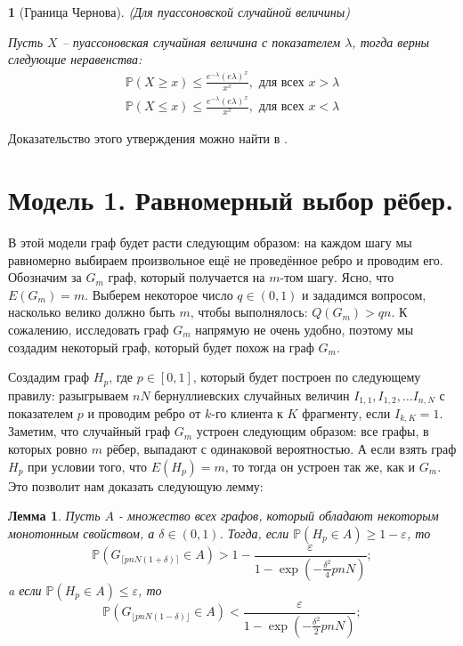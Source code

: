 \documentclass{matmex-diploma-custom}
\newcommand{\PRob}{\mathbb P}
\newcommand{\leqs}{\leqslant}
\newcommand{\geqs}{\geqslant}
\newcommand{\eps}{\varepsilon}
\newtheorem{lemma}{Лемма}
\theoremstyle{named}
\newtheorem*{namedpropo}{}
\begin{document}
\begin{namedpropo}[Граница Чернова] (Для пуассоновской случайной величины)

Пусть $X$ -- пуассоновская случайная величина с показателем $\lambda$, тогда верны следующие неравенства:
\begin{align} \label{gr_1}
\PRob(X \geqs x) \leqs \frac{e^{-\lambda}(e\lambda)^x}{x^x}, \text{ для всех } x > \lambda 
\\
\label{gr_2}
\PRob(X \leqs x) \leqs \frac{e^{-\lambda}(e\lambda)^x}{x^x}, \text{ для всех } x < \lambda 
\end{align}
\end{namedpropo}
Доказательство этого утверждения можно найти в \cite{chernov_gr}.

\section*{Модель 1. Равномерный выбор рёбер.}
В этой модели граф будет расти следующим образом: на каждом шагу мы равномерно выбираем произвольное ещё не проведённое ребро 
и проводим его. Обозначим за $G_m$ граф, который получается на $m$-том шагу. Ясно, что $E(G_m) = m$.
Выберем некоторое число $q \in (0, 1)$ и зададимся вопросом, насколько велико должно быть $m$, чтобы выполнялось: $Q(G_m) > qn$.
К сожалению, исследовать граф $G_m$ напрямую не очень удобно, поэтому мы создадим некоторый граф, который будет похож на граф $G_m$.

Создадим граф $H_p$, где $p \in [0, 1]$, который будет построен по следующему правилу: 
разыгрываем $nN$ бернуллиевских случайных величин $I_{1,1}, I_{1,2}, \dots I_{n,N}$ с показателем $p$ и проводим ребро от $k$-го клиента к $K$ фрагменту, 
если $I_{k, K} = 1$.
Заметим, что случайный граф $G_m$ устроен следующим образом: все графы, в которых ровно $m$ рёбер, выпадают с одинаковой вероятностью.
А если взять граф $H_p$ при условии того, что $E(H_p) = m$, то тогда он устроен так же, как и $G_m$.
Это позволит нам доказать следующую лемму:

\begin{lemma} \label{l1}
Пусть $A$ - множество всех графов, который обладают некоторым монотонным свойством, а $\delta \in (0,1)$.
Тогда, если $\PRob( H_p \in A) \geqs 1 - \eps$, то
\begin{equation} \label{l1_1}
\PRob(G_{\lceil pnN(1+\delta) \rceil} \in A) > 1 - \frac{\eps}{1 - \exp\left(-\frac{\delta^2}{4}pnN\right)};
\end{equation}
a если $\PRob( H_p \in A) \leqs \eps$, то
\begin{equation}\label{l1_2}
\PRob(G_{\lfloor pnN(1-\delta) \rfloor} \in A) < \frac{\eps}{1 - \exp\left(-\frac{\delta^2}{2}pnN\right)};
\end{equation}
\end{lemma}
\end{document}
